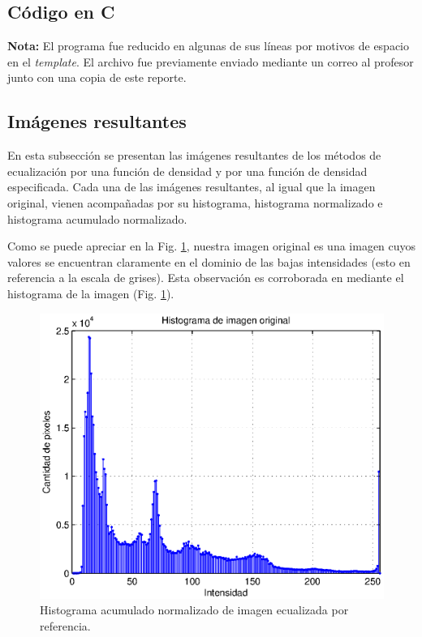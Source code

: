 \documentclass{article}
\begin{document}
\subsection{Código en C}\label{sec:cod}
\textbf{Nota:} El programa fue reducido en algunas de sus líneas por motivos de espacio en el \emph{template}. El archivo fue previamente enviado mediante un correo al profesor junto con una copia de este reporte.\\




\subsection{Imágenes resultantes}\label{sec:ima}
En esta subsección se presentan las imágenes resultantes de los métodos de ecualización por una función de densidad y por una función de densidad especificada. Cada una de las imágenes resultantes, al igual que la imagen original, vienen acompañadas por su histograma, histograma normalizado e histograma acumulado normalizado.

Como se puede apreciar en la Fig. \ref{fig:2}, nuestra imagen original es una imagen cuyos valores se encuentran claramente en el dominio de las bajas intensidades (esto en referencia a la escala de grises). Esta observación es corroborada en mediante el histograma de la imagen (Fig. \ref{fig:2}).

\begin{figure}
\includegraphics[width=1\textwidth]{imagen/imagen002.eps}
\caption{Histograma acumulado normalizado de imagen ecualizada por referencia.}
\label{fig:2} 
\end{figure}
\end{document}
